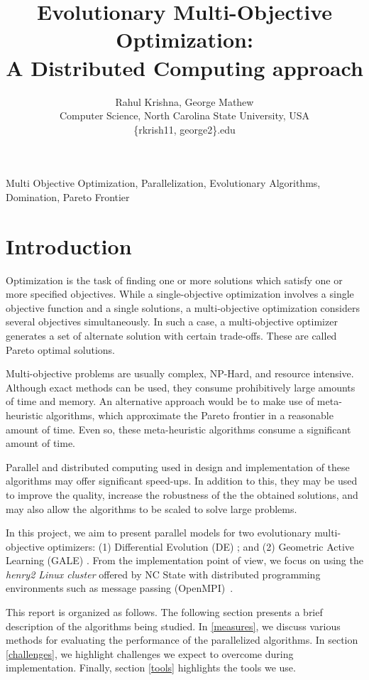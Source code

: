 \documentclass[conference]{IEEEtran}
\author{Rahul Krishna, George Mathew\\
	Computer Science, North Carolina State University, USA\\
	\{rkrish11, george2\}\@ncsu.edu
}
\title{Evolutionary Multi-Objective Optimization:\\ A Distributed Computing approach}
\begin{document}
	\maketitle
	\begin{abstract}

	\end{abstract}
	\begin{IEEEkeywords}
        Multi Objective Optimization, Parallelization, Evolutionary Algorithms, Domination, Pareto Frontier
	\end{IEEEkeywords}
	
	\section{Introduction} 
Optimization is the task of finding one or more solutions which satisfy one or more specified objectives. While a single-objective optimization involves a single objective function and a single solutions, a multi-objective optimization considers several objectives simultaneously. In such a  case, a multi-objective optimizer generates a set of alternate solution with certain trade-offs. These are called Pareto optimal solutions.

Multi-objective problems are usually complex, NP-Hard, and resource intensive. Although exact methods can be used, they consume prohibitively large amounts of time and memory. An alternative approach would be to make use of meta-heuristic algorithms, which approximate the Pareto frontier in a reasonable amount of time. Even so, these meta-heuristic algorithms consume a significant amount of time. 

Parallel and distributed computing used in design and implementation of these algorithms may offer significant speed-ups. In addition to this, they may be used to improve the quality, increase the robustness of the the obtained solutions, and may also allow the algorithms to be scaled to solve large problems. 

In this project, we aim to present parallel models for two evolutionary multi-objective optimizers: (1) Differential Evolution (DE) \cite{storn97}; and (2) Geometric Active Learning (GALE) \cite{krall15}. From the implementation point of view, we focus on using the \textit{henry2 Linux cluster} offered by NC State with distributed programming environments such as message passing (OpenMPI)~\cite{openMPI04}.

This report is organized as follows. The following section presents a brief description of the algorithms being studied. In \textsection\ref{measures}, we discuss various methods for evaluating the performance of the parallelized algorithms. In section \textsection\ref{challenges}, we highlight challenges we expect to overcome during implementation. Finally, section \textsection\ref{tools} highlights the tools we use.
\end{document}
